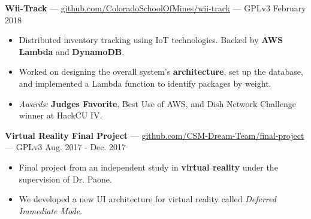 \documentclass[10pt,letterpaper]{article}
\begin{document}
\textbf{Wii-Track} ---
\href{https://github.com/ColoradoSchoolOfMines/wii-track}{github.com/ColoradoSchoolOfMines/wii-track}
--- GPLv3 \hfill February 2018
\begin{itemize}
    \item Distributed inventory tracking using IoT technologies. Backed by
        \textbf{AWS Lambda} and \textbf{DynamoDB}.
    \item Worked on designing the overall system's \textbf{architecture}, set up
        the database, and implemented a Lambda function to identify packages by
        weight.
    \item \textit{Awards:} \textbf{Judges Favorite}, Best Use of AWS, and Dish
        Network Challenge winner at HackCU IV.
\end{itemize}

\textbf{Virtual Reality Final Project} ---
\href{https://github.com/CSM-Dream-Team/final-project}{github.com/CSM-Dream-Team/final-project}
--- GPLv3 \hfill Aug. 2017 - Dec. 2017
\begin{itemize}
    \item Final project from an independent study in \textbf{virtual reality}
        under the supervision of Dr. Paone.
    \item We developed a new UI architecture for virtual reality called
        \textit{Deferred Immediate Mode}.
\end{itemize}
\end{document}
